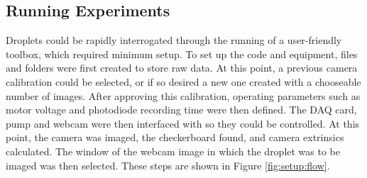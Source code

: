 \documentclass{physics_article_B}
\begin{document}
    \subsection{Running Experiments\label{sect:method:exp}}
        
        Droplets could be rapidly interrogated through the running of a user-friendly toolbox, which required minimum setup. To set up the code and equipment, files and folders were first created to store raw data. At this point, a previous camera calibration could be selected, or if so desired a new one created with a chooseable number of images. After approving this calibration, operating parameters such as motor voltage and photodiode recording time were then defined. The DAQ card, pump and webcam were then interfaced with so they could be controlled. At this point, the camera was imaged, the checkerboard found, and camera extrinsics calculated. The window of the webcam image in which the droplet was to be imaged was then selected. These steps are shown in Figure \ref{fig:setup:flow}.
        
\end{document}
